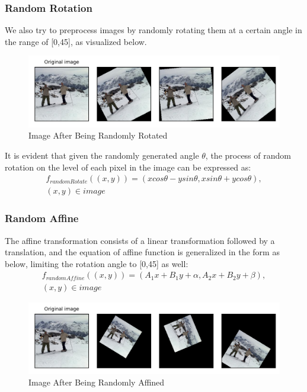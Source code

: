 \documentclass{article}
\begin{document}
\subsubsection{Random Rotation}
We also try to preprocess images by randomly rotating them at a certain angle in the range of [0\textdegree,45\textdegree], as visualized below.
\begin{figure}[H]
\centerline{\includegraphics[scale=0.6]{Random rotate 1.0.png}}
\caption{Image After Being Randomly Rotated}
\label{fig6}
\end{figure}
It is evident that given the randomly generated angle $\theta$, the process of random rotation on the level of each pixel in the image can be expressed as:
\begin{multline}
f_{randomRotate}((x,y))=(xcos\theta-ysin\theta,xsin\theta+ycos\theta), \\(x,y)\in image
\end{multline}

\subsubsection{Random Affine}
The affine transformation consists of a linear transformation followed by a translation, and the equation of affine function is generalized in the form as below, limiting the rotation angle to [0\textdegree,45\textdegree] as well: 
\begin{multline}
f_{randomAffine}((x,y))=(A_1x+B_1y+\alpha,A_2x+B_2y+\beta),\\(x,y)\in image
\end{multline}

\begin{figure}[H]
\centerline{\includegraphics[scale=0.6]{Random Affine 1.0.png}}
\caption{Image After Being Randomly Affined}
\label{fig7}
\end{figure}
\end{document}
